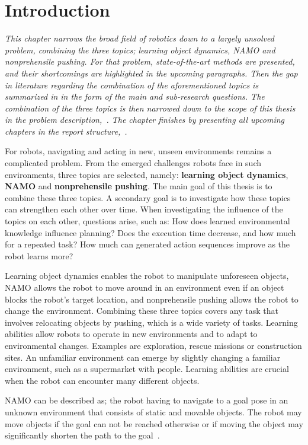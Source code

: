 \chapter{Introduction}%
\label{chap:introduction}
\textit{This chapter narrows the broad field of robotics down to a largely unsolved problem, combining the three topics; learning object dynamics, \ac{NAMO} and nonprehensile pushing. For that problem, state-of-the-art methods are presented, and their shortcomings are highlighted in the upcoming paragraphs. Then the gap in literature regarding the combination of the aforementioned topics is summarized in  in the form of the main and sub-research questions. The combination of the three topics is then narrowed down to the scope of this thesis in the problem description,~. The chapter finishes by presenting all upcoming chapters in the report structure,~.\bs}

For robots, navigating and acting in new, unseen environments remains a complicated problem. From the emerged challenges robots face in such environments, three topics are selected, namely: \textbf{learning object dynamics}, \textbf{\acf{NAMO}} and \textbf{nonprehensile pushing}. The main goal of this thesis is to combine these three topics. A secondary goal is to investigate how these topics can strengthen each other over time. When investigating the influence of the topics on each other, questions arise, such as: How does learned environmental knowledge influence planning? Does the execution time decrease, and how much for a repeated task? How much can generated action sequences improve as the robot learns more?\bs

Learning object dynamics enables the robot to manipulate unforeseen objects, \ac{NAMO} allows the robot to move around in an environment even if an object blocks the robot's target location, and nonprehensile pushing allows the robot to change the environment. Combining these three topics covers any task that involves relocating objects by pushing, which is a wide variety of tasks. Learning abilities allow robots to operate in new environments and to adapt to environmental changes. Examples are exploration, rescue missions or construction sites. An unfamiliar environment can emerge by slightly changing a familiar environment, such as a supermarket with people. Learning abilities are crucial when the robot can encounter many different objects.\bs

\acl{NAMO} can be described as; the robot having to navigate to a goal pose in an unknown environment that consists of static and movable objects. The robot may move objects if the goal can not be reached otherwise or if moving the object may significantly shorten the path to the goal~\cite{hai-ningwu_navigation_2010}.\bs

